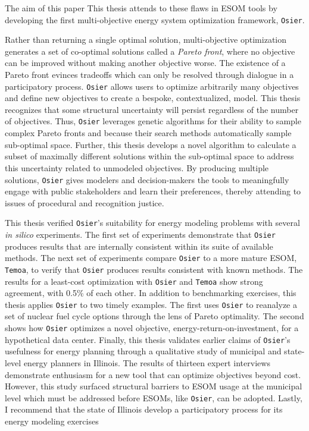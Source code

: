 The aim of this paper This thesis attends to these 
flaws in ESOM tools by developing the first multi-objective energy system 
optimization framework, \texttt{Osier}.

Rather than returning a single optimal solution, multi-objective optimization
generates a set of co-optimal solutions called a \textit{Pareto front}, where no
objective can be improved without making another objective worse. The existence
of a Pareto front evinces tradeoffs which can only be resolved through dialogue
in a participatory process. \texttt{Osier} allows users to optimize arbitrarily
many objectives and define new objectives to create a bespoke, contextualized,
model. This thesis recognizes that some structural uncertainty will persist
regardless of the number of objectives. Thus, \texttt{Osier} leverages genetic
algorithms for their ability to sample complex Pareto fronts and because their
search methods automatically sample sub-optimal space. Further, this thesis
develops a novel algorithm to calculate a subset of maximally different
solutions within the sub-optimal space to address this uncertainty related to
unmodeled objectives. By producing multiple solutions, \texttt{Osier} gives
modelers and decision-makers the tools to meaningfully engage with public
stakeholders and learn their preferences, thereby attending to issues of
procedural and recognition justice.

This thesis verified \texttt{Osier}'s suitability for energy modeling problems
with several \textit{in silico} experiments. The first set of experiments demonstrate that
\texttt{Osier} produces results that are internally consistent within its suite
of available methods. The next set of experiments compare \texttt{Osier} to a
more mature ESOM, \texttt{Temoa}, to verify that \texttt{Osier} produces results
consistent with known methods. The results for a least-cost optimization with
\texttt{Osier} and \texttt{Temoa} show strong agreement, with 0.5\% of each
other. In addition to benchmarking exercises, this thesis applies \texttt{Osier}
to two timely examples. The first uses \texttt{Osier} to reanalyze a set of
nuclear fuel cycle options through the lens of Pareto optimality. The second
shows how \texttt{Osier} optimizes a novel objective,
energy-return-on-investment, for a hypothetical data center. Finally, this
thesis validates earlier claims of \texttt{Osier}'s usefulness for energy
planning through a qualitative study of municipal and state-level energy
planners in Illinois. The results of thirteen expert interviews demonstrate
enthusiasm for a new tool that can optimize objectives beyond cost. However,
this study surfaced structural barriers to ESOM usage at the municipal level
which must be addressed before ESOMs, like \texttt{Osier}, can be adopted.
Lastly, I recommend that the state of Illinois develop a participatory process
for its energy modeling exercises

